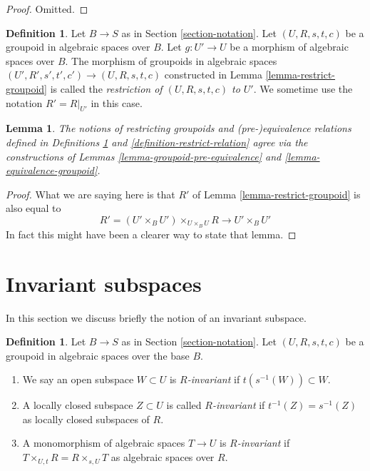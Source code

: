\documentclass{stacks-project}
\theoremstyle{plain}
\newtheorem{lemma}[subsection]{Lemma}
\theoremstyle{definition}
\newtheorem{definition}[subsection]{Definition}
\theoremstyle{remark}
\numberwithin{equation}{subsection}
\begin{document}
\begin{proof}
Omitted.
\end{proof}

\begin{definition}
\label{definition-restrict-groupoid}
Let $B \to S$ as in Section \ref{section-notation}.
Let $(U, R, s, t, c)$ be a groupoid in algebraic spaces over $B$.
Let $g : U' \to U$ be a morphism of algebraic spaces over $B$.
The morphism of groupoids in algebraic spaces
$(U', R', s', t', c') \to (U, R, s, t, c)$
constructed in Lemma \ref{lemma-restrict-groupoid} is called
the {\it restriction of $(U, R, s, t, c)$ to $U'$}.
We sometime use the notation $R' = R|_{U'}$ in this case.
\end{definition}

\begin{lemma}
\label{lemma-restrict-groupoid-relation}
The notions of restricting groupoids and
(pre-)equivalence relations defined in Definitions
\ref{definition-restrict-groupoid} and \ref{definition-restrict-relation}
agree via the constructions of
Lemmas \ref{lemma-groupoid-pre-equivalence} and
\ref{lemma-equivalence-groupoid}.
\end{lemma}

\begin{proof}
What we are saying here is that $R'$ of
Lemma \ref{lemma-restrict-groupoid} is also
equal to
$$
R' = (U' \times_B U')\times_{U \times_B U} R
\longrightarrow
U' \times_B U'
$$
In fact this might have been a clearer way to state that lemma.
\end{proof}





\section{Invariant subspaces}
\label{section-invariant}

\noindent
In this section we discuss briefly the notion of an invariant subspace.

\begin{definition}
\label{definition-invariant-open}
Let $B \to S$ as in Section \ref{section-notation}.
Let $(U, R, s, t, c)$ be a groupoid in algebraic spaces over the base $B$.
\begin{enumerate}
\item We say an open subspace $W \subset U$ is {\it $R$-invariant} if
$t(s^{-1}(W)) \subset W$.
\item A locally closed subspace $Z \subset U$ is called {\it $R$-invariant}
if $t^{-1}(Z) = s^{-1}(Z)$ as locally closed subspaces of $R$.
\item A monomorphism of algebraic spaces $T \to U$ is {\it $R$-invariant}
if $T \times_{U, t} R = R \times_{s, U} T$ as algebraic spaces over $R$.
\end{enumerate}
\end{definition}
\end{document}

